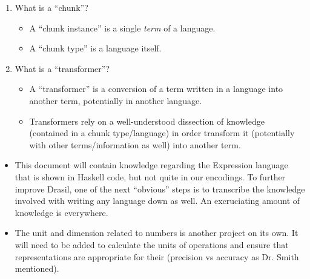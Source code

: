 \begin{enumerate}

      \item What is a ``chunk''?
            \begin{itemize}

                  \item A ``chunk instance'' is a single \textit{term} of a
                        language.
                        
                  \item A ``chunk type'' is a language itself.
                  
            \end{itemize}

      \item What is a ``transformer''?
            \begin{itemize}

                  \item A ``transformer'' is a conversion of a term written in a
                        language into another term, potentially in another
                        language.
                        
                  \item Transformers rely on a well-understood dissection of
                        knowledge (contained in a chunk type/language) in order
                        transform it (potentially with other terms/information
                        as well) into another term.
                        
            \end{itemize}

\end{enumerate}


\begin{itemize}

      \item This document will contain knowledge regarding the Expression language
            that is shown in Haskell code, but not quite in our encodings. To
            further improve Drasil, one of the next ``obvious'' steps is to
            transcribe the knowledge involved with writing any language down as
            well. An excruciating amount of knowledge is everywhere.

      \item The unit and dimension related to numbers is another project on its
            own. It will need to be added to calculate the units of operations and
            ensure that representations are appropriate for their (precision vs
            accuracy as Dr. Smith mentioned).

\end{itemize}
